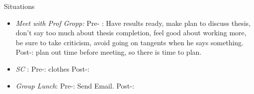 \documentclass[serif, mathserif, final]{beamer}
\begin{document}
\begin{frame}{}
\begin{columns}
\begin{column}{0.20\linewidth}
  \begin{block}{Situations} 
    \begin{itemize} 
    \item \tiny \textit{Meet with Prof Gropp: } Pre- : Have results ready, make plan to discuss thesis, don't say too much about thesis completion, feel good about working more, be sure to take criticism, avoid going on tangents when he says something.   
      Post-: plan out time before meeting, so there is time to plan. 
    \item \tiny \textit{SC} : Pre-: clothes   Post-:  
    \item \tiny \textit{Group Lunch}:  Pre-: Send Email.  Post-: 
    \end{itemize}
  \end{block}
\end{column}%

\end{columns}

\end{frame}
\end{document}
